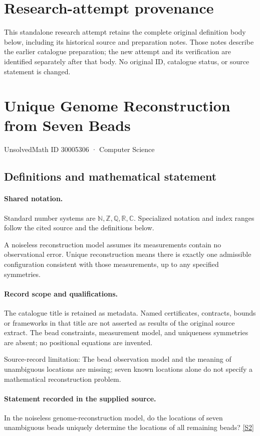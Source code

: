 \documentclass[11pt]{article}
\begin{document}
\section*{Research-attempt provenance}
This standalone research attempt retains the complete original definition body below,
including its historical source and preparation notes. Those notes describe the
earlier catalogue preparation; the new attempt and its verification are identified
separately after that body. No original ID, catalogue status, or source statement is changed.

\section{Unique Genome Reconstruction from Seven Beads}\label{30005306}
{\small UnsolvedMath ID 30005306 · Computer Science}
\subsection{Definitions and mathematical statement}

\paragraph{Shared notation.}Standard number systems are $\mathbb N,\mathbb Z,\mathbb Q,\mathbb R,\mathbb C$. Specialized notation and index ranges follow the cited source and the definitions below.


A noiseless reconstruction model assumes its measurements contain no observational error. Unique reconstruction means there is exactly one admissible configuration consistent with those measurements, up to any specified symmetries.
\paragraph{Record scope and qualifications.}
The catalogue title is retained as metadata. Named certificates, contracts, bounds or frameworks in that title are not asserted as results of the original source extract.
The bead constraints, measurement model, and uniqueness symmetries are absent; no positional equations are invented.

Source-record limitation: The bead observation model and the meaning of unambiguous locations are missing; seven known locations alone do not specify a mathematical reconstruction problem.
\paragraph{Statement recorded in the supplied source.}
In the noiseless genome-reconstruction model, do the locations of seven unambiguous beads uniquely determine the locations of all remaining beads? \href{https://doi.org/10.4171/owr/2022/55}{[S2]}
\end{document}
